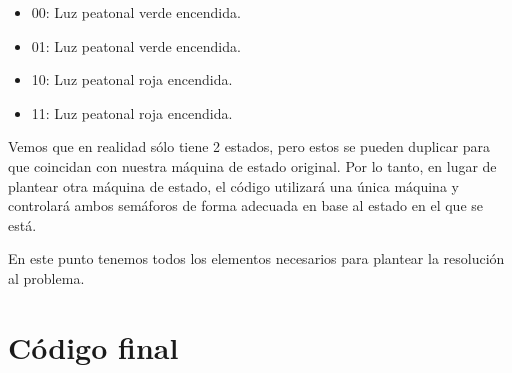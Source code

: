 \documentclass{article}
\begin{document}
\begin{itemize}
    \item 00: Luz peatonal verde encendida.
    \item 01: Luz peatonal verde encendida.
    \item 10: Luz peatonal roja encendida.
    \item 11: Luz peatonal roja encendida.
\end{itemize}

Vemos que en realidad sólo tiene 2 estados, pero estos se pueden duplicar para
que coincidan con nuestra máquina de estado original. Por lo tanto, en lugar
de plantear otra máquina de estado, el código utilizará una única máquina y
controlará ambos semáforos de forma adecuada en base al estado en el que se
está.

En este punto tenemos todos los elementos necesarios para plantear la
resolución al problema.

\section{Código final}

\end{document}
